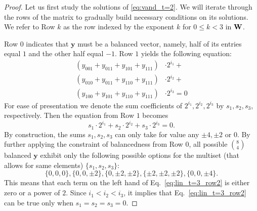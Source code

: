 \begin{proof}
   \smallskip

    Let us first study the solutions of \eqref{eq:vand_t=2}. We will
    iterate through the rows of the matrix to gradually build necessary
    conditions on its solutions. We refer to Row $k$ as the row indexed by the exponent $k$ for $0\leq k <3$ in $\mathbf{W}$.

    Row $0$ indicates that $\mathbf{y}$ must be a balanced vector, namely, half of its entries equal $1$ and the other half equal $-1$.
    Row $1$ yields the following equation:
    \begin{equation*}
        \begin{split}
            (y_{001} + y_{011} + y_{101} + y_{111}) &\cdot 2^{i_1} +\\
            (y_{010} + y_{011} + y_{110} + y_{111}) &\cdot 2^{i_2} +\\
            (y_{100} + y_{101} + y_{110} + y_{111}) &\cdot 2^{i_3} = 0
        \end{split}
    \end{equation*}
    For ease of presentation we denote the sum coefficients of $2^{i_1},2^{i_2},2^{i_3}$ by $s_1, s_2,s_3$, respectively. Then the equation from Row $1$ becomes
    \begin{equation}\label{eq:lin_t=3_row2}
    s_1 \cdot 2^{i_1} + s_2 \cdot 2^{i_2} + s_3 \cdot 2^{i_3} = 0.
    \end{equation}
    By construction, the sums $s_1, s_2, s_3$ can only take for value any $\pm 4, \pm 2$
    or 0. By further applying the constraint of balancedness from Row $0$, all possible
    $\binom{8}{4}$ balanced $\mathbf{y}$ exhibit only the following possible options for the multiset
     (that allows for same elements) $\{s_1,s_2,s_3\}$:
    \[
    \{0, 0, 0\},  \{0, 0, \pm 2\}, \{0, \pm2, \pm2\}, \{\pm2, \pm2, \pm2\}, \{0, 0, \pm4\}.
    \]
    This means that each term on the left hand of Eq.~\eqref{eq:lin_t=3_row2} is either zero or a power of $2$.
	Since $i_1 < i_2 < i_3$, it implies that Eq.~\eqref{eq:lin_t=3_row2} can be true only
	when $s_1=s_2=s_3=0$.


\end{proof}
